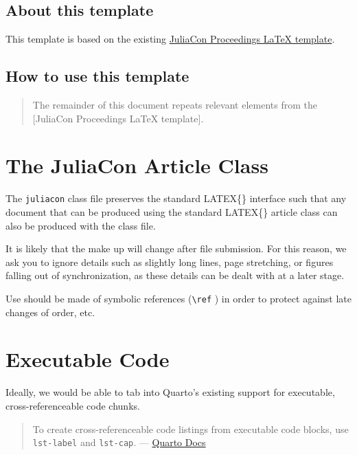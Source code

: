 \documentclass{juliacon}
\begin{document}
\subsection{About this template}\label{about-this-template}

This template is based on the existing
\href{https://github.com/JuliaCon/JuliaConSubmission.jl}{JuliaCon
Proceedings LaTeX template}.

\subsection{How to use this template}\label{how-to-use-this-template}

\begin{quote}
The remainder of this document repeats relevant elements from the
{[}JuliaCon Proceedings LaTeX template{]}.
\end{quote}

\section{The JuliaCon Article Class}\label{sec-documentclass}

The \texttt{juliacon} class file preserves the standard LATEX\{\}
interface such that any document that can be produced using the standard
LATEX\{\} article class can also be produced with the class file.

It is likely that the make up will change after file submission. For
this reason, we ask you to ignore details such as slightly long lines,
page stretching, or figures falling out of synchronization, as these
details can be dealt with at a later stage.

Use should be made of symbolic references (\verb|\ref| ) in order to
protect against late changes of order, etc.

\section{Executable Code}\label{executable-code}

Ideally, we would be able to tab into Quarto's existing support for
executable, cross-referenceable code chunks.

\begin{quote}
To create cross-referenceable code listings from executable code blocks,
use \texttt{lst-label} and \texttt{lst-cap}. ---
\href{https://quarto.org/docs/prerelease/1.4/crossref.html\#cross-referenceable-listings-of-executable-code-blocks}{Quarto
Docs}
\end{quote}
\end{document}
